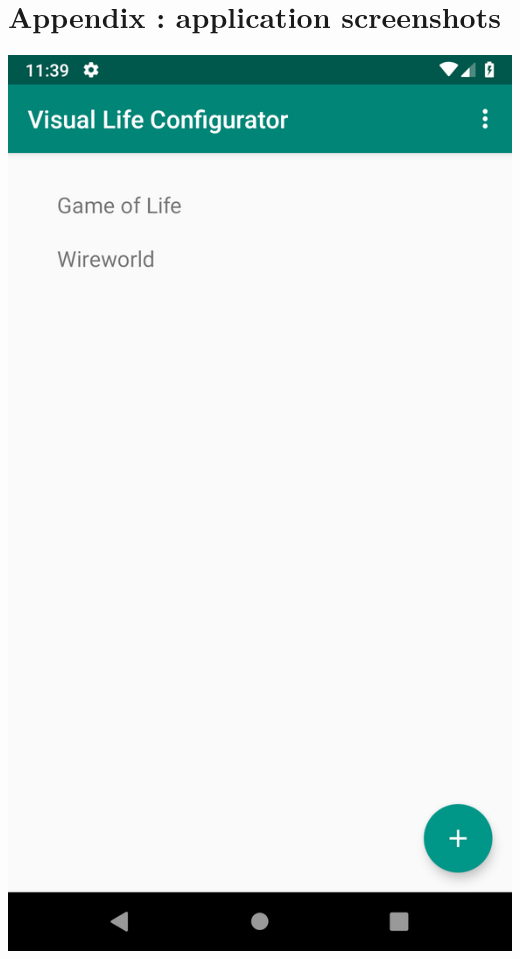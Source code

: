 \documentclass{report}
\begin{document}
\chapter{Appendix : application screenshots}
\begin{minipage}{.45\textwidth}
  \begin{minipage}{.45\linewidth}
    \includegraphics[width=\linewidth]{screens/home.png}
  \end{minipage}\hfill
  \begin{minipage}{.45\linewidth}

\end{minipage}
\end{minipage}
\end{document}
